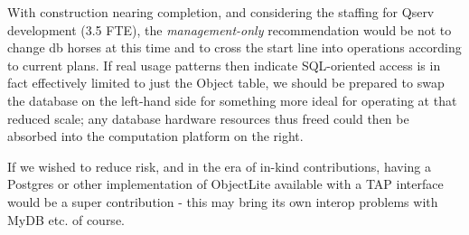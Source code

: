 With construction nearing completion, and considering the staffing for Qserv development (3.5 FTE), the \textit{management-only} recommendation would be not to change db horses at this time and to cross the start line into operations according to current plans.  If real usage patterns then indicate SQL-oriented access is in fact effectively limited to just the Object table, we should be prepared to swap the database on the left-hand side for something more ideal for operating at that reduced scale; any database hardware resources thus freed could then be absorbed into the computation platform on the right.

If we wished to reduce risk, and in the era of in-kind contributions, having a Postgres or other implementation of ObjectLite available with a TAP interface would be a super contribution - this may bring its own interop problems with MyDB etc. of course.
